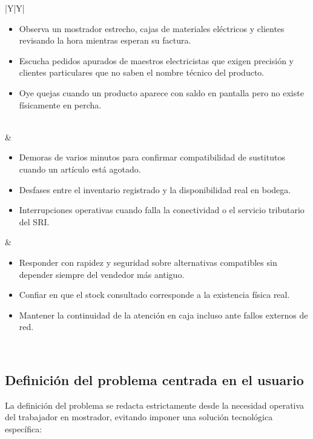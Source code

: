 {\begin{tabularx}{\linewidth}{|Y|Y|}
\begin{itemize}[leftmargin=12pt,itemsep=2pt,topsep=2pt]
    \item Observa un mostrador estrecho, cajas de materiales el\'ectricos y clientes revisando la hora mientras esperan su factura.
    \item Escucha pedidos apurados de maestros electricistas que exigen precisi\'on y clientes particulares que no saben el nombre t\'ecnico del producto.
    \item Oye quejas cuando un producto aparece con saldo en pantalla pero no existe f\'isicamente en percha.
\end{itemize}\\
\hline
{} & \\
\hline
\begin{itemize}[leftmargin=12pt,itemsep=2pt,topsep=2pt]
    \item Demoras de varios minutos para confirmar compatibilidad de sustitutos cuando un art\'iculo est\'a agotado.
    \item Desfases entre el inventario registrado y la disponibilidad real en bodega.
    \item Interrupciones operativas cuando falla la conectividad o el servicio tributario del SRI.
\end{itemize}
&
\begin{itemize}[leftmargin=12pt,itemsep=2pt,topsep=2pt]
    \item Responder con rapidez y seguridad sobre alternativas compatibles sin depender siempre del vendedor m\'as antiguo.
    \item Confiar en que el stock consultado corresponde a la existencia f\'isica real.
    \item Mantener la continuidad de la atenci\'on en caja incluso ante fallos externos de red.
\end{itemize}\\
\hline
\end{tabularx}
}

\subsection{Definici\'on del problema centrada en el usuario}
La definici\'on del problema se redacta estrictamente desde la necesidad operativa del trabajador en mostrador, evitando imponer una soluci\'on tecnol\'ogica espec\'ifica:

